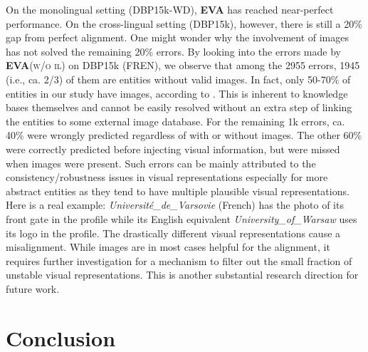 \documentclass[letterpaper]{article} \usepackage{aaai21}  \usepackage{times}  \usepackage{helvet} \usepackage{courier}  \usepackage[hyphens]{url}  \usepackage{graphicx} \urlstyle{rm} \def\UrlFont{\rm}  \usepackage{natbib}  \usepackage{caption} \frenchspacing  \setlength{\pdfpagewidth}{8.5in}  \setlength{\pdfpageheight}{11in}
\newcommand{\modelname}[0]{\textbf{\textsc{EVA}}\xspace}
\begin{document}
On the monolingual setting (DBP15k-WD), \modelname has reached near-perfect performance. On the cross-lingual setting (DBP15k), however, there is still a 20\% gap from perfect alignment. One might wonder why the involvement of images has not solved the remaining 20\% errors. 
By looking into the errors made by \modelname (\textsc{w/o il}) on DBP15k (FREN), we observe that among the 2955 errors, 1945 (i.e., ca. 2/3) of them are entities without valid images. In fact, only 50-70\% of entities in our study have images, according to . This is inherent to knowledge bases themselves and cannot be easily resolved without an extra step of linking the entities to some external image database. For the remaining 1k errors, ca. 40\% were wrongly predicted regardless of with or without images. 
The other 60\% were correctly predicted before injecting visual information, but were missed when images were present. Such errors can be mainly attributed to the consistency/robustness issues in visual representations especially for more abstract entities as they tend to have multiple plausible visual representations.
Here is a real example: \emph{Universit\'e\_de\_Varsovie} (French) has the photo of its front gate in the profile while its English equivalent \emph{University\_of\_Warsaw} uses its logo in the profile. The drastically different visual representations cause a misalignment. 
While images are in most cases helpful for the alignment, it requires further investigation for a mechanism to filter out the small fraction of unstable visual representations. This is another substantial research direction for future work.







 






















 \section{Conclusion}
\label{sec:conclusion}
\end{document}
